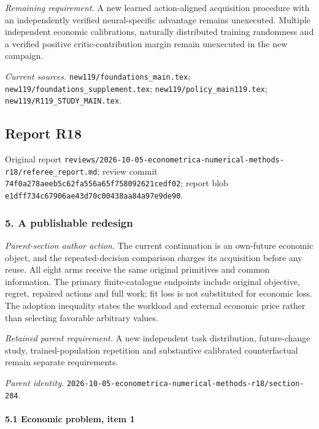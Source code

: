 \par\emph{Remaining requirement.} A new learned action-aligned acquisition procedure with an independently verified neural-specific advantage remains unexecuted. Multiple independent economic calibrations, naturally distributed training randomness and a verified positive critic-contribution margin remain unexecuted in the new campaign.

\par\emph{Current sources.} \nolinkurl{new119/foundations_main.tex}; \nolinkurl{new119/foundations_supplement.tex}; \nolinkurl{new119/policy_main119.tex}; \nolinkurl{new119/R119_STUDY_MAIN.tex}.

\subsection{Report R18}

Original report \nolinkurl{reviews/2026-10-05-econometrica-numerical-methods-r18/referee_report.md}; review commit \nolinkurl{74f0a278aeeb5c62fa556a65f758092621cedf02}; report blob \nolinkurl{e1dff734c67906ae43d70c00438aa84a97e9de90}.

\subsubsection{5. A publishable redesign}

\emph{Parent-section author action.} The current continuation is an own-future economic object, and the repeated-decision comparison charges its acquisition before any reuse. All eight arms receive the same original primitives and common information. The primary finite-catalogue endpoints include original objective, regret, repaired actions and full work; fit loss is not substituted for economic loss. The adoption inequality states the workload and external economic price rather than selecting favorable arbitrary values.

\par\emph{Retained parent requirement.} A new independent task distribution, future-change study, trained-population repetition and substantive calibrated counterfactual remain separate requirements.

\par\emph{Parent identity.} \nolinkurl{2026-10-05-econometrica-numerical-methods-r18/section-284}.

\paragraph{5.1 Economic problem, item 1}

